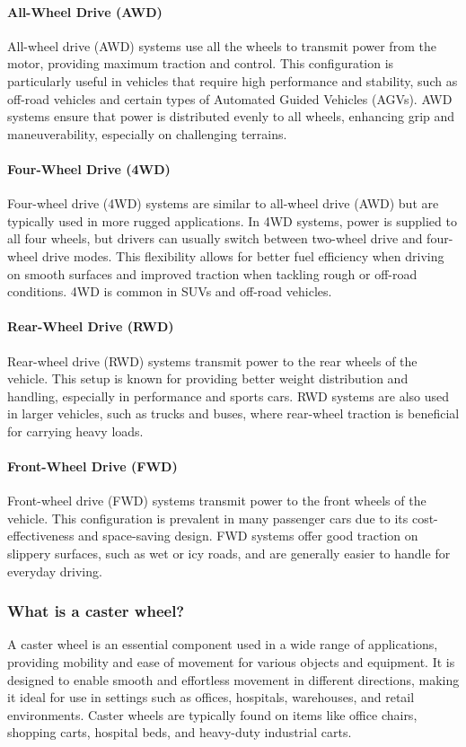 \documentclass[../../main]{subfiles}
\begin{document}
\paragraph{All-Wheel Drive (AWD)}
All-wheel drive (AWD) systems use all the wheels to transmit power from the motor, providing maximum traction and control. This configuration is particularly useful in vehicles that require high performance and stability, such as off-road vehicles and certain types of Automated Guided Vehicles (AGVs). AWD systems ensure that power is distributed evenly to all wheels, enhancing grip and maneuverability, especially on challenging terrains.

\paragraph{Four-Wheel Drive (4WD)}

Four-wheel drive (4WD) systems are similar to all-wheel drive (AWD) but are typically used in more rugged applications. In 4WD systems, power is supplied to all four wheels, but drivers can usually switch between two-wheel drive and four-wheel drive modes. This flexibility allows for better fuel efficiency when driving on smooth surfaces and improved traction when tackling rough or off-road conditions. 4WD is common in SUVs and off-road vehicles.

\paragraph{Rear-Wheel Drive (RWD)}
Rear-wheel drive (RWD) systems transmit power to the rear wheels of the vehicle. This setup is known for providing better weight distribution and handling, especially in performance and sports cars. RWD systems are also used in larger vehicles, such as trucks and buses, where rear-wheel traction is beneficial for carrying heavy loads.

\paragraph{Front-Wheel Drive (FWD)}
Front-wheel drive (FWD) systems transmit power to the front wheels of the vehicle. This configuration is prevalent in many passenger cars due to its cost-effectiveness and space-saving design. FWD systems offer good traction on slippery surfaces, such as wet or icy roads, and are generally easier to handle for everyday driving.

\subsubsection{What is a caster wheel?}
A caster wheel is an essential component used in a wide range of applications, providing mobility and ease of movement for various objects and equipment. It is designed to enable smooth and effortless movement in different directions, making it ideal for use in settings such as offices, hospitals, warehouses, and retail environments. Caster wheels are typically found on items like office chairs, shopping carts, hospital beds, and heavy-duty industrial carts.
\end{document}
